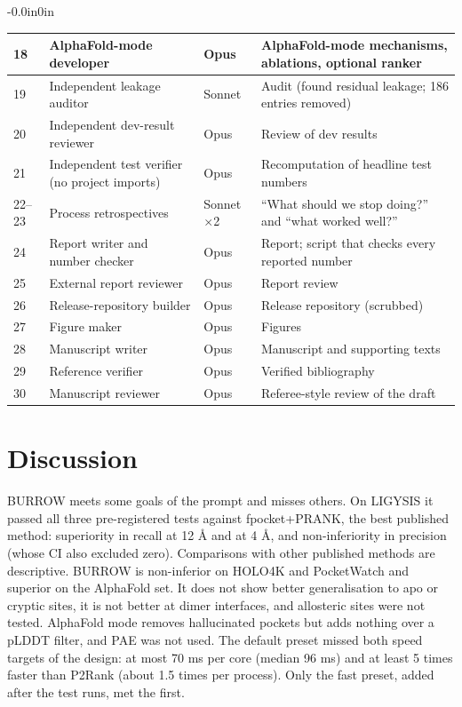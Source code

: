 \documentclass[10pt,letterpaper]{article}
\begin{document}
\begin{table}[!ht]
\begin{adjustwidth}{-0.0in}{0in}
{\begin{tabular}{p{0.6cm}p{5.6cm}p{1.6cm}p{6.3cm}}
18 & AlphaFold-mode developer & Opus & AlphaFold-mode mechanisms, ablations, optional ranker \\ \hline
19 & Independent leakage auditor & Sonnet & Audit (found residual leakage; 186 entries removed) \\ \hline
20 & Independent dev-result reviewer & Opus & Review of dev results \\ \hline
21 & Independent test verifier (no project imports) & Opus & Recomputation of headline test numbers \\ \hline
22--23 & Process retrospectives & Sonnet $\times$2 & ``What should we stop doing?'' and ``what worked well?'' \\ \hline
24 & Report writer and number checker & Opus & Report; script that checks every reported number \\ \hline
25 & External report reviewer & Opus & Report review \\ \hline
26 & Release-repository builder & Opus & Release repository (scrubbed) \\ \hline
27 & Figure maker & Opus & Figures \\ \hline
28 & Manuscript writer & Opus & Manuscript and supporting texts \\ \hline
29 & Reference verifier & Opus & Verified bibliography \\ \hline
30 & Manuscript reviewer & Opus & Referee-style review of the draft \\ \hline
\end{tabular}}
\end{adjustwidth}
\end{table}

\section*{Discussion}

BURROW meets some goals of the prompt and misses others. On LIGYSIS it passed all three pre-registered tests against fpocket+PRANK, the best published method: superiority in recall at 12 \AA{} and at 4 \AA{}, and non-inferiority in precision (whose CI also excluded zero). Comparisons with other published methods are descriptive. BURROW is non-inferior on HOLO4K and PocketWatch and superior on the AlphaFold set. It does not show better generalisation to apo or cryptic sites, it is not better at dimer interfaces, and allosteric sites were not tested. AlphaFold mode removes hallucinated pockets but adds nothing over a pLDDT filter, and PAE was not used. The default preset missed both speed targets of the design: at most 70 ms per core (median 96 ms) and at least 5 times faster than P2Rank (about 1.5 times per process). Only the fast preset, added after the test runs, met the first.
\end{document}
